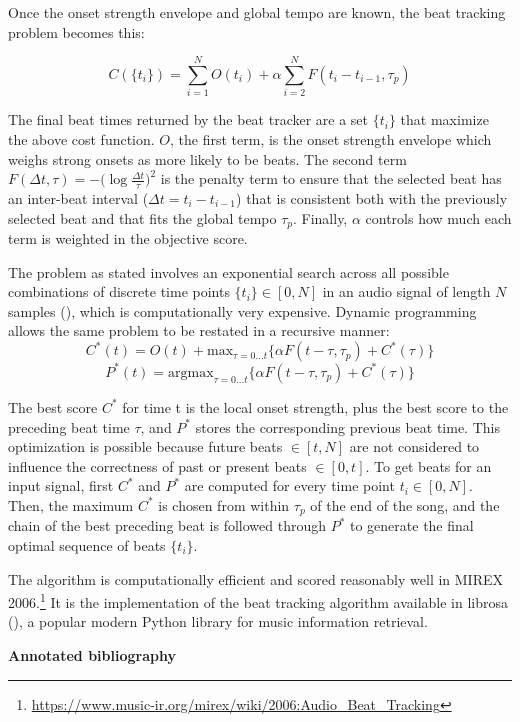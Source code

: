 \documentclass[letter,11pt]{report}
\begin{document}
Once the onset strength envelope and global tempo are known, the beat tracking problem becomes this:

\[ C(\{t_{i}\}) = \sum_{i=1}^{N}O(t_{i}) + \alpha\sum_{i=2}^{N}F(t_{i}-t_{i-1}, \tau_{p}) \]

The final beat times returned by the beat tracker are a set $\{t_{i}\}$ that maximize the above cost function. $O$, the first term, is the onset strength envelope which weighs strong onsets as more likely to be beats. The second term $F(\Delta t, \tau) = -\Big(\log\frac{\Delta t}{\tau}\Big)^{2}$ is the penalty term to ensure that the selected beat has an inter-beat interval ($\Delta t = t_{i}-t_{i-1}$) that is consistent both with the previously selected beat and that fits the global tempo $\tau_{p}$. Finally, $\alpha$ controls how much each term is weighted in the objective score.

The problem as stated involves an exponential search across all possible combinations of discrete time points $\{t_{i}\} \in [0, N]$ in an audio signal of length $N$ samples (\cite{ellis2}), which is computationally very expensive. Dynamic programming allows the same problem to be restated in a recursive manner:
\[ C^{*}(t) = O(t) + \text{max}_{\tau = 0...t}\{\alpha F(t-\tau, \tau_{p}) + C^{*}(\tau)\} \]
\[ P^{*}(t) = \text{argmax}_{\tau = 0...t} \{\alpha F(t-\tau, \tau_{p}) + C^{*}(\tau)\} \]

The best score $C^{*}$ for time t is the local onset strength, plus the best score to the preceding beat time $\tau$, and $P^{*}$ stores the corresponding previous beat time. This optimization is possible because future beats $\in [t, N]$ are not considered to influence the correctness of past or present beats $\in [0, t]$. To get beats for an input signal, first $C^{*}$ and $P^{*}$ are computed for every time point $t_{i} \in [0, N]$. Then, the maximum $C^{*}$ is chosen from within $\tau_{p}$ of the end of the song, and the chain of the best preceding beat is followed through $P^{*}$ to generate the final optimal sequence of beats $\{t_{i}\}$.

The algorithm is computationally efficient and scored reasonably well in MIREX 2006.\footnote{\href{https://www.music-ir.org/mirex/wiki/2006:Audio_Beat_Tracking}{https://www.music-ir.org/mirex/wiki/2006:Audio\_Beat\_Tracking}} It is the implementation of the beat tracking algorithm available in librosa (\cite{librosa}), a popular modern Python library for music information retrieval.

\vfill
\clearpage

\noindent\LARGE{\textbf{Annotated bibliography}}\\

\vspace{-0.5em}

\printbibliography[heading=none]
\end{document}
